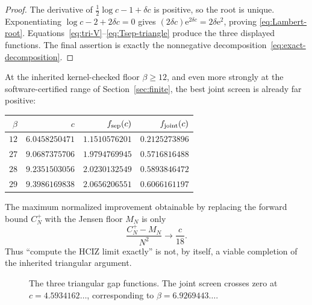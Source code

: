\documentclass[11pt]{article}
\newcommand{\e}{\mathrm e}
\newcommand{\1}{\mathbf 1}
\theoremstyle{plain}
\theoremstyle{definition}
\theoremstyle{remark}
\begin{document}
\begin{proof}
The derivative of $\frac12\log c-1+\delta c$ is positive, so the root is
unique.  Exponentiating
$\log c-2+2\delta c=0$ gives
$(2\delta c)\e^{2\delta c}=2\delta\e^2$, proving
\eqref{eq:Lambert-root}.  Equations~\eqref{eq:tri-V}--\eqref{eq:Tsep-triangle}
produce the three displayed functions.  The final assertion is exactly the
nonnegative decomposition~\eqref{eq:exact-decomposition}.
\end{proof}

At the inherited kernel-checked floor $\beta\ge12$, and even more strongly at
the software-certified range of Section~\ref{sec:finite}, the best joint
screen is already far positive:
\begin{center}
\begin{tabular}{@{}rrrr@{}}
\toprule
$\beta$ & $c$ & $f_{\rm sep}(c)$ & $f_{\rm joint}(c)$\\
\midrule
$12$ & $6.0458250471$ & $1.1510576201$ & $0.2125273896$\\
$27$ & $9.0687375706$ & $1.9794769945$ & $0.5716816488$\\
$28$ & $9.2351503056$ & $2.0230132549$ & $0.5893846472$\\
$29$ & $9.3986169838$ & $2.0656206551$ & $0.6066161197$\\
\bottomrule
\end{tabular}
\end{center}
The maximum normalized improvement obtainable by replacing the forward
bound $C_N^+$ with the Jensen floor $M_N$ is only
\begin{equation}\label{eq:max-HCIZ-gain}
 \frac{C_N^+-M_N}{N^2}\longrightarrow \frac c{18}.
\end{equation}
Thus ``compute the HCIZ limit exactly'' is not, by itself, a viable completion
of the inherited triangular argument.

\begin{figure}[htbp]
\centering
{}
\caption{The three triangular gap functions.  The joint screen crosses zero
at $c=4.5934162\ldots$, corresponding to $\beta=6.9269443\ldots$.}
\label{fig:tri-gaps}
\end{figure}
\end{document}

